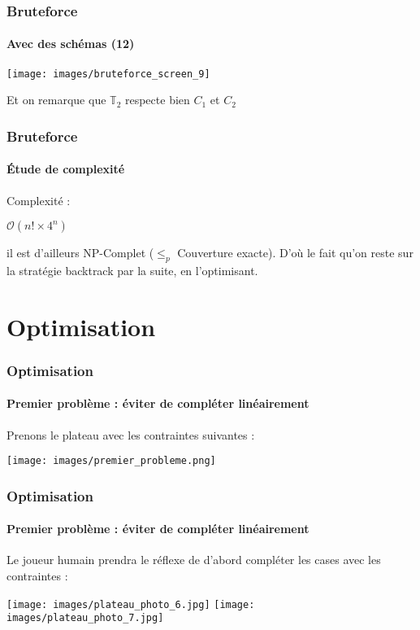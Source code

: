 \documentclass{beamer}
\begin{document}
\begin{frame}
	\frametitle{Bruteforce}
	\framesubtitle{Avec des schémas (12)}
	\begin{center}
		\texttt{[image: images/bruteforce\_screen\_9]}
	\end{center}
	Et on remarque que $\mathbb{T}_2$ respecte bien  $C_1$  et  $C_2$
\end{frame}

 \begin{frame}
	\frametitle{Bruteforce}
	\framesubtitle{Étude de complexité}
	Complexité : 
	\begin{center}
		$\mathcal{O}(n! \times 4^n)$ 
	\end{center}

	\begin{flushright}
		il est d'ailleurs NP-Complet ($\leq_p$ Couverture exacte). 
		D'où le fait qu'on reste sur la stratégie backtrack par la suite, en l'optimisant.
	\end{flushright}

	
\end{frame}

\section{Optimisation}
	

\begin{frame}
	\frametitle{Optimisation}
	\framesubtitle{Premier problème : éviter de compléter linéairement}
	Prenons le plateau avec les contraintes suivantes : 
	\begin{center}
		\texttt{[image: images/premier\_probleme.png]}
	\end{center}
\end{frame}
\begin{frame}
	\frametitle{Optimisation}
	\framesubtitle{Premier problème : éviter de compléter linéairement}
	Le joueur humain prendra le réflexe de d'abord compléter les cases avec les contraintes : 
	\begin{center}
		\vspace*{\fill}
		\texttt{[image: images/plateau\_photo\_6.jpg]} 
		\texttt{[image: images/plateau\_photo\_7.jpg]}  \\ \vspace*{\fill} 

	\end{center}
\end{frame}
\end{document}
